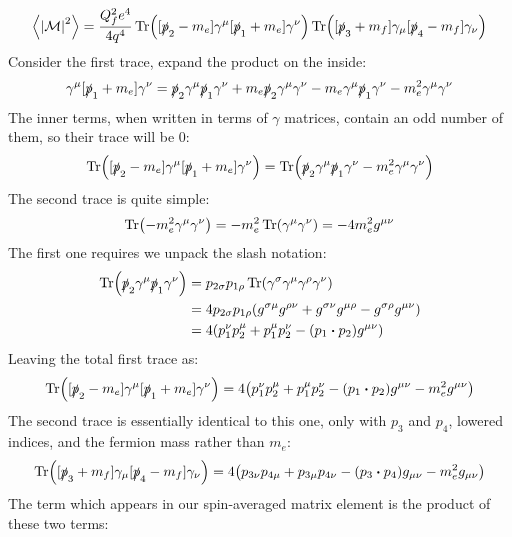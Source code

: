 \documentclass[12pt]{article}
\newcommand{\sla}{\slashed}
\newcommand{\M}{\mathcal{M}}
\begin{document}
\begin{align*}
  \ev{\abs{\M}^2}=\frac{Q_f^2e^4}{4q^4}
  \Tr([\sla{p}_2-m_e]\gamma^\mu[\sla{p}_1+m_e]\gamma^\nu)
  \Tr([\sla{p}_3+m_f]\gamma_\mu[\sla{p}_4-m_f]\gamma_\nu)
\end{align*}
Consider the first trace, expand the product on the inside:
\begin{align*}
  [\sla{p}_2-m_e]\gamma^\mu[\sla{p}_1+m_e]\gamma^\nu=
  \sla{p}_2\gamma^\mu\sla{p}_1\gamma^\nu
  +m_e\sla{p}_2\gamma^\mu\gamma^\nu-m_e\gamma^\mu\sla{p}_1\gamma^\nu
  -m_e^2\gamma^\mu\gamma^\nu
\end{align*}
The inner terms, when written in terms of $\gamma$ matrices, contain an odd number of them, so their trace will be $0$:
\begin{align*}
  \Tr([\sla{p}_2-m_e]\gamma^\mu[\sla{p}_1+m_e]\gamma^\nu)
  =\Tr(\sla{p}_2\gamma^\mu\sla{p}_1\gamma^\nu-m_e^2\gamma^\mu\gamma^\nu)
\end{align*}
The second trace is quite simple:
\begin{align*}
  \Tr(-m_e^2\gamma^\mu\gamma^\nu)=-m_e^2\Tr(\gamma^\mu\gamma^\nu)
  =-4m_e^2g^{\mu\nu}
\end{align*}
The first one requires we unpack the slash notation:
\begin{align*}
  \Tr(\sla{p}_2\gamma^\mu\sla{p}_1\gamma^\nu)&=
  p_{2\sigma}p_{1\rho}\Tr(\gamma^\sigma\gamma^\mu\gamma^\rho\gamma^\nu)\\
  &=4p_{2\sigma}p_{1\rho}\qty(
  g^{\sigma\mu}g^{\rho\nu}+g^{\sigma\nu}g^{\mu\rho}-g^{\sigma\rho}g^{\mu\nu})\\
  &=4\qty(p_1^\nu p_2^\mu+p_1^\mu p_2^\nu-(p_1\vdot p_2)g^{\mu\nu})
\end{align*}
Leaving the total first trace as:
\begin{align*}
  \Tr([\sla{p}_2-m_e]\gamma^\mu[\sla{p}_1+m_e]\gamma^\nu)
  =4\qty(p_1^\nu p_2^\mu+p_1^\mu p_2^\nu-(p_1\vdot p_2)g^{\mu\nu}-m_e^2g^{\mu\nu})
\end{align*}
The second trace is essentially identical to this one, only with $p_3$ and $p_4$, lowered indices, and the fermion mass rather than $m_e$:
\begin{align*}
  \Tr([\sla{p}_3+m_f]\gamma_\mu[\sla{p}_4-m_f]\gamma_\nu)
  =4\qty(p_{3\nu} p_{4\mu}+p_{3\mu} p_{4\nu}
  -(p_3\vdot p_4)g_{\mu\nu}-m_e^2g_{\mu\nu})
\end{align*}
The term which appears in our spin-averaged matrix element is the product of these two terms:
\end{document}
